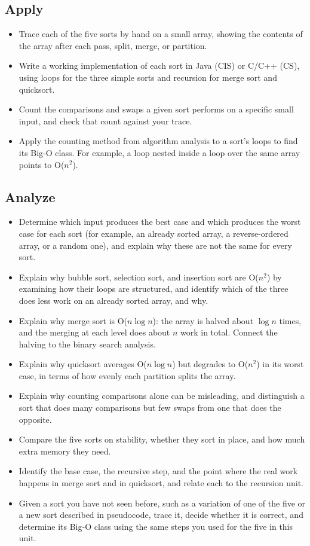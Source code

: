 \documentclass[11pt]{article}
\begin{document}
\subsection*{Apply}
\begin{itemize}[leftmargin=1.4em]
  \item Trace each of the five sorts by hand on a small array, showing the contents of the
    array after each pass, split, merge, or partition.
  \item Write a working implementation of each sort in Java (CIS) or C/C++ (CS), using loops
    for the three simple sorts and recursion for merge sort and quicksort.
  \item Count the comparisons and swaps a given sort performs on a specific small input, and
    check that count against your trace.
  \item Apply the counting method from algorithm analysis to a sort's loops to find its
    Big-O class. For example, a loop nested inside a loop over the same array points to
    O($n^2$).
\end{itemize}

\subsection*{Analyze}
\begin{itemize}[leftmargin=1.4em]
  \item Determine which input produces the best case and which produces the worst case for
    each sort (for example, an already sorted array, a reverse-ordered array, or a random
    one), and explain why these are not the same for every sort.
  \item Explain why bubble sort, selection sort, and insertion sort are O($n^2$) by
    examining how their loops are structured, and identify which of the three does less work
    on an already sorted array, and why.
  \item Explain why merge sort is O($n \log n$): the array is halved about $\log n$ times,
    and the merging at each level does about $n$ work in total. Connect the halving to the
    binary search analysis.
  \item Explain why quicksort averages O($n \log n$) but degrades to O($n^2$) in its worst
    case, in terms of how evenly each partition splits the array.
  \item Explain why counting comparisons alone can be misleading, and distinguish a sort
    that does many comparisons but few swaps from one that does the opposite.
  \item Compare the five sorts on stability, whether they sort in place, and how much extra
    memory they need.
  \item Identify the base case, the recursive step, and the point where the real work
    happens in merge sort and in quicksort, and relate each to the recursion unit.
  \item Given a sort you have not seen before, such as a variation of one of the five or a
    new sort described in pseudocode, trace it, decide whether it is correct, and determine
    its Big-O class using the same steps you used for the five in this unit.
\end{itemize}
\end{document}
